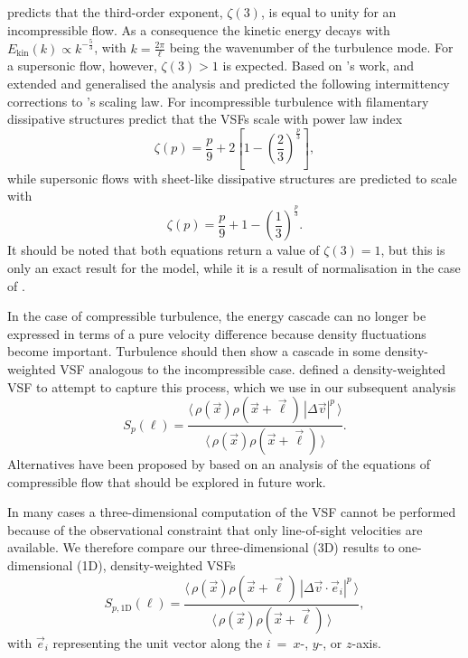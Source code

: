 \documentclass{aa}		%
\begin{document}
\citet{Kolmogorov1941} predicts that the third-order exponent, $\zeta(3)$, is equal to unity for an incompressible flow.
As a consequence the kinetic energy decays with $E_{\mathrm{kin}}(k) \propto k^{-\frac{5}{3}}$, with $k = \frac{2 \pi}{\ell}$ being the wavenumber of the turbulence mode.
For a supersonic flow, however, $\zeta(3) >1$ is expected.
Based on \citeauthor{Kolmogorov1941}'s work, \citet{She1994} and \citet{Boldyrev2002} extended and generalised the analysis and predicted the following intermittency corrections to \citeauthor{Kolmogorov1941}'s scaling law.
For incompressible turbulence with filamentary dissipative structures \citet{She1994} predict that
the VSFs scale with power law index
\begin{equation}
	\zeta(p) = \frac{p}{9} + 2 \left[ 1 - \left( \frac{2}{3} \right)^{\frac{p}{3}} \right] ,
	\label{equ:method:she}
\end{equation}
while supersonic flows with sheet-like dissipative structures are predicted to scale with \citep{Boldyrev2002}
\begin{equation}
	\zeta(p) = \frac{p}{9} + 1 - \left( \frac{1}{3} \right)^{\frac{p}{3}}.
	\label{equ:method:boldyrev}
\end{equation}
\noindent
It should be noted that both equations return a value of $\zeta(3) =1$, but this is only an exact result for the \citeauthor{She1994} model, while it is a result of normalisation in the case of \citeauthor{Boldyrev2002}. 

In the case of compressible turbulence, the energy cascade can no longer be expressed in terms of a pure velocity difference because density fluctuations become important.
Turbulence should then show a cascade in some density-weighted VSF analogous to the incompressible case.
\citet{Padoan2016a} defined a density-weighted VSF to attempt to capture this process, which we use in our subsequent analysis
\begin{equation}
	{S}_p (\ell) = \frac{\langle \, \rho(\vec{x}) \rho(\vec{x}+\vec{\ell}) \, |\Delta \vec{v}|^p  \, \rangle}{\langle  \, \rho(\vec{x}) \rho(\vec{x}+\vec{\ell}) \, \rangle}.
	\label{equ:method:def_vsf_dw}
\end{equation}
Alternatives have been proposed by \citet{Kritsuk2013a} based on an analysis of the equations of compressible flow that should be explored in future work.

In many cases a three-dimensional computation of the VSF cannot be performed because of the observational constraint that only line-of-sight velocities are available.
We therefore compare our three-dimensional (3D) results to one-dimensional (1D), density-weighted VSFs
\begin{equation}
	\mathit{S}_{p,\mathrm{1D}} (\ell) = \frac{\langle \, \rho(\vec{x}) \rho(\vec{x}+\vec{\ell}) \, |\Delta 
        \vec{v} \cdot \vec{e}_i|^p  \, \rangle}{\langle  \, \rho(\vec{x}) \rho(\vec{x}+\vec{\ell}) \, \rangle} ,
	\label{equ:method:def_vsf_1d}
\end{equation}
with $\vec{e}_i$ representing the unit vector along the $i$~=~$x$-, $y$-, or $z$-axis.
\end{document}

